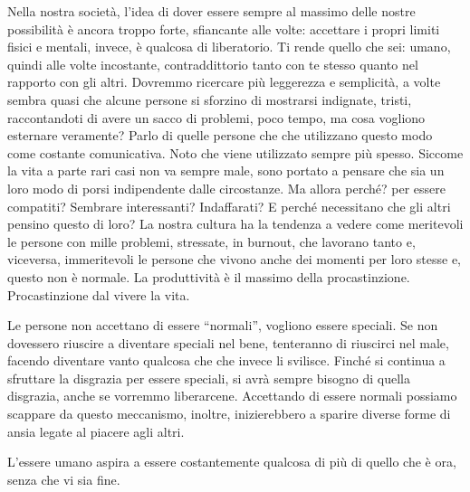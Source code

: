 \documentclass[12pt]{book} %
\begin{document}
\bigskip

Nella nostra società, l'idea di dover essere sempre al massimo delle nostre possibilità è ancora
troppo forte, sfiancante alle volte: accettare i propri limiti fisici e mentali, invece, è qualcosa di liberatorio. Ti
rende quello che sei: umano, quindi alle volte incostante, contraddittorio tanto con te stesso quanto nel rapporto con
gli altri. Dovremmo ricercare più
leggerezza e semplicità, a volte sembra quasi che alcune persone si sforzino di mostrarsi indignate, tristi,
raccontandoti di avere un sacco di problemi, poco tempo, ma cosa vogliono esternare veramente? Parlo di quelle persone
che che utilizzano questo modo come costante comunicativa. Noto che viene utilizzato sempre più spesso. Siccome la vita
a parte rari casi non va sempre male, sono portato a pensare che sia un loro modo di porsi indipendente dalle
circostanze. Ma allora perché? per essere compatiti? Sembrare interessanti? Indaffarati? E perché necessitano che gli
altri pensino questo di loro? La nostra cultura ha la tendenza a vedere come meritevoli le persone con mille problemi,
stressate, in burnout, che lavorano tanto e, viceversa, immeritevoli le persone che vivono anche dei momenti per loro
stesse e, questo non è normale. La produttività è il massimo della procastinzione. Procastinzione dal vivere la vita.

Le persone non accettano di essere “normali”, vogliono essere speciali. Se non dovessero riuscire a diventare speciali
nel bene, tenteranno di riuscirci nel male, facendo diventare vanto qualcosa che che invece li svilisce. Finché si
continua a sfruttare la disgrazia per essere speciali, si avrà sempre bisogno di quella disgrazia, anche se vorremmo
liberarcene. Accettando di essere normali possiamo scappare da questo meccanismo, inoltre, inizierebbero a sparire
diverse forme di ansia legate al piacere agli altri. 

L'essere umano aspira a essere costantemente qualcosa di più di quello che è ora, senza che vi sia fine.
\end{document}

